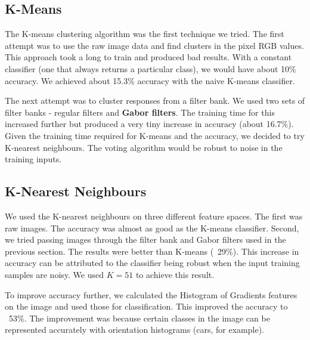 \documentclass{article} %
\begin{document}
\subsection{K-Means} %
        The K-means clustering algorithm was the first technique we tried. The first attempt was to use the raw image data and find clusters in the pixel RGB values. This approach took a long to train and produced bad results. With a constant classifier (one that always returns a particular class), we would have about 10\% accuracy. We achieved about 15.3\% accuracy with the naive K-means classifier. %

        The next attempt was to cluster responses from a filter bank. We used two sets of filter banks - regular filters and \textbf{Gabor filters}. The training time for this increased further but produced a very tiny increase in accuracy (about 16.7\%). Given the training time required for K-means and the accuracy, we decided to try K-nearest neighbours. The voting algorithm would be robust to noise in the training inputs.

\subsection{K-Nearest Neighbours} %
We used the K-nearest neighbours on three different feature spaces. The first was raw images. The accuracy was almost as good as the K-means classifier. Second, we tried passing images through the filter bank and Gabor filters used in the previous section. The results were better than K-means (~29\%). This increase in accuracy can be attributed to the classifier being robust when the input training samples are noisy. We used $K=51$ to achieve this result.

        To improve accuracy further, we calculated the Histogram of Gradients features on the image and used those for classification. This improved the accuracy to ~53\%. The improvement was because certain classes in the image can be represented accurately with orientation histograms (cars, for example).
\end{document}
